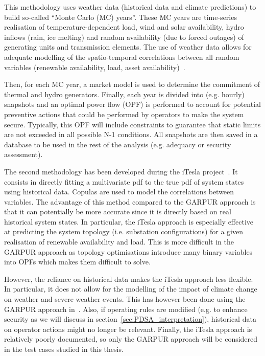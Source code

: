 This methodology uses weather data (historical data and climate predictions) to build so-called ``Monte Carlo (MC) years''. These MC years are time-series realisation of temperature-dependent load, wind and solar availability, hydro inflows (rain, ice melting) and random availability (due to forced outages) of generating units and transmission elements. The use of weather data allows for adequate modelling of the spatio-temporal correlations between all random variables (renewable availability, load, asset availability)~\cite{StrathGARPUR, ENTSOE_MC_year}.

Then, for each MC year, a market model is used to determine the commitment of thermal and hydro generators. Finally, each year is divided into (e.g. hourly) snapshots and an optimal power flow (OPF) is performed to account for potential preventive actions that could be performed by operators to make the system secure. Typically, this OPF will include constraints to guarantee that static limits are not exceeded in all possible N-1 conditions. All snapshots are then saved in a database to be used in the rest of the analysis (e.g. adequacy or security assessment).


The second methodology has been developed during the iTesla project~\cite{KonstantelosCopulas, EurostagHPC, iTesla_uncertainties}. It consists in directly fitting a multivariate pdf to the true pdf of system states using historical data. Copulas are used to model the correlations between variables. The advantage of this method compared to the GARPUR approach is that it can potentially be more accurate since it is directly based on real historical system states. In particular, the iTesla approach is especially effective at predicting the system topology (i.e. substation configurations) for a given realisation of renewable availability and load. This is more difficult in the GARPUR approach as topology optimisations introduce many binary variables into OPFs which makes them difficult to solve.

However, the reliance on historical data makes the iTesla approach less flexible. In particular, it does not allow for the modelling of the impact of climate change on weather and severe weather events. This has however been done using the GARPUR approach in~\cite{ENTSOE_MC_year}. Also, if operating rules are modified (e.g. to enhance security as we will discuss in section~\ref{sec:PDSA_interpretation}), historical data on operator actions might no longer be relevant. Finally, the iTesla approach is relatively poorly documented, so only the GARPUR approach will be considered in the test cases studied in this thesis.


